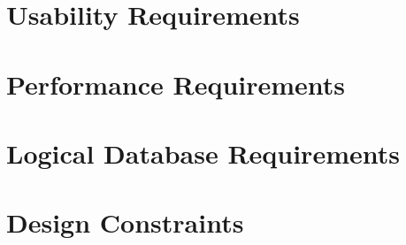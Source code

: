 \documentclass{scrreprt}
\begin{document}
\section{Usability Requirements}


\section{Performance Requirements}
\section{Logical Database Requirements}


\section{Design Constraints}
\end{document}
